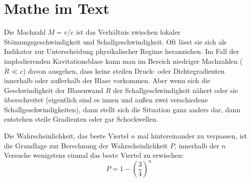 \chapter{Mathe im Text}%

Die Machzahl $M=v/c$ ist das Verhältnis zwischen lokaler Stömungsgeschwindigkeit und Schallgeschwindigkeit. Oft lässt sie sich als Indikator zur Unterscheidung physikalischer Regime heranziehen. Im Fall der implodierenden Kavitationsblase kann man im Bereich niedriger Machzahlen ($\dot{R}\ll c$) davon ausgehen, dass keine steilen Druck- oder Dichtegradienten innerhalb oder außerhalb der Blase vorkommen. Aber wenn sich die Geschwindigkeit der Blasenwand $\dot{R}$ der Schallgeschwindigkeit nähert oder sie überschreitet (eigentlich sind es innen und außen zwei verschiedene Schallgeschwindigkeiten), dann stellt sich die Situation ganz anders dar, dann entstehen steile Gradienten oder gar Schockwellen.

Die Wahrscheinlichkeit, das beste Viertel $n$ mal hintereinander zu verpassen, ist die Grundlage zur Berechnung der Wahrscheinlichkeit $P$, innerhalb der $n$ Versuche wenigstens einmal das beste Viertel zu erwischen:
\begin{equation}
P=1-\left( \frac{3}{4} \right)^n
\end{equation}

